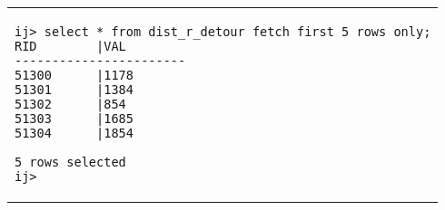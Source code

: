 \begin{tabular}{p{}}
\begin{verbatim}
ij> select * from dist_r_detour fetch first 5 rows only;
RID        |VAL
-----------------------
51300      |1178
51301      |1384
51302      |854
51303      |1685
51304      |1854

5 rows selected
ij>
\end{verbatim}\\
\end{tabular}
